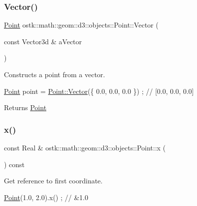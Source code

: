 \subsubsection{\texorpdfstring{Vector()}{Vector()}}
{\footnotesize\ttfamily \hyperlink{classostk_1_1math_1_1geom_1_1d3_1_1objects_1_1_point}{Point} ostk\+::math\+::geom\+::d3\+::objects\+::\+Point\+::\+Vector (\begin{DoxyParamCaption}\item[{const Vector3d \&}]{a\+Vector }\end{DoxyParamCaption})\hspace{0.3cm}{\ttfamily [static]}}



Constructs a point from a vector. 


\begin{DoxyCode}
\hyperlink{classostk_1_1math_1_1geom_1_1d3_1_1objects_1_1_point_ad9bee5dadb878200f859b20a34680ae5}{Point} point = \hyperlink{classostk_1_1math_1_1geom_1_1d3_1_1objects_1_1_point_a74796fec8c39081bc8d766d70e44651d}{Point::Vector}(\{ 0.0, 0.0, 0.0 \}) ; \textcolor{comment}{// [0.0, 0.0, 0.0]}
\end{DoxyCode}


\begin{DoxyReturn}{Returns}
\hyperlink{classostk_1_1math_1_1geom_1_1d3_1_1objects_1_1_point}{Point} 
\end{DoxyReturn}
\mbox{\label{classostk_1_1math_1_1geom_1_1d3_1_1objects_1_1_point_a68a5204a2ca259486a1c1e442c833203}} 
\subsubsection{\texorpdfstring{x()}{x()}}
{\footnotesize\ttfamily const Real \& ostk\+::math\+::geom\+::d3\+::objects\+::\+Point\+::x (\begin{DoxyParamCaption}{ }\end{DoxyParamCaption}) const}



Get reference to first coordinate. 


\begin{DoxyCode}
\hyperlink{classostk_1_1math_1_1geom_1_1d3_1_1objects_1_1_point_ad9bee5dadb878200f859b20a34680ae5}{Point}(1.0, 2.0).x() ; \textcolor{comment}{// &1.0}
\end{DoxyCode}


